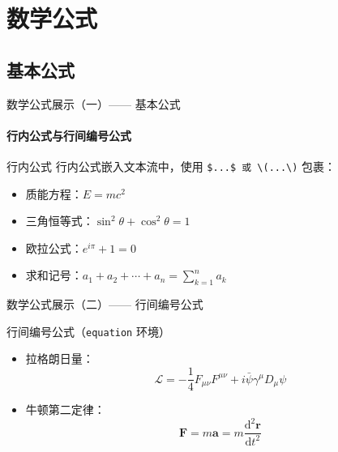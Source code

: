 \documentclass[10pt,aspectratio=169]{beamer}
\begin{document}
\section{数学公式}
\subsection{基本公式}
\begin{frame}{数学公式展示（一）—— 基本公式}
  \framesubtitle{行内公式与行间编号公式}
  
  \begin{block}{行内公式}
    行内公式嵌入文本流中，使用 \texttt{\$...\$ 或 \textbackslash(...\textbackslash)} 包裹：
    \begin{itemize}
      \item 质能方程：$E = mc^2$
      \item 三角恒等式：$\sin^2\theta + \cos^2\theta = 1$
      \item 欧拉公式：$e^{i\pi} + 1 = 0$
      \item 求和记号：$a_1 + a_2 + \cdots + a_n = \sum_{k=1}^{n} a_k$
    \end{itemize}
  \end{block}
\end{frame}
\begin{frame}{数学公式展示（二）—— 行间编号公式}
  \vspace{.2cm}
  \begin{block}{行间编号公式（\texttt{equation} 环境）}
    \begin{itemize}
      \item 拉格朗日量：
      \begin{equation}
        \mathcal{L} = -\frac{1}{4} F_{\mu\nu}F^{\mu\nu} + i\bar{\psi}\gamma^\mu D_\mu\psi
      \end{equation}
      \item 牛顿第二定律：
      \begin{equation}
        \mathbf{F} = m\mathbf{a} = m\frac{\mathrm{d}^2\mathbf{r}}{\mathrm{d}t^2}
      \end{equation}
    \end{itemize}
  \end{block}
\end{frame}


\end{document}
